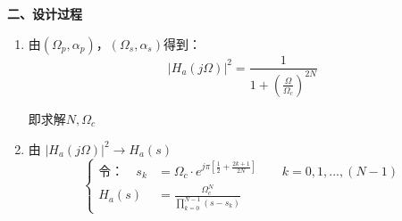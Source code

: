 \documentclass[notheorems,compress,mathserif,table]{beamer}
\begin{document}
\begin{frame}\frametitle{}%
\textbf{二、设计过程}

\begin{enumerate}
  \item  由$(\Omega_{p},\alpha_{p})$，$(\Omega_{s},\alpha_{s})$得到：
      $$        |H_{a}(j\Omega)|^{2}= \frac{1}{1+(\frac{\Omega}{\Omega_{c}})^{2N}}         $$

      即求解$N,\Omega_{c}$
  \item   由
  $|H_a(j\Omega)|^{2}\longrightarrow H_{a}(s)$
      $$
        \left\{ \begin{aligned}
            \mbox{令：}\quad s_{k} &=\Omega_{c}\cdot e^{j\pi\left[\frac{1}{2}+\frac{2k+1}{2N}\right]}  \quad\quad k=0,1,...,(N-1) \\
            H_{a}(s) &= \frac{\Omega_{c}^{N}}{\prod^{N-1}_{k=0}(s-s_{k})}
        \end{aligned} \right.
      $$
\end{enumerate}
\end{frame}
\end{document}
